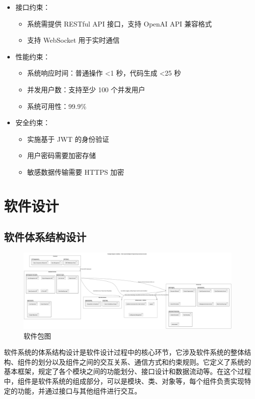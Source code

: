 \documentclass[
    report,     %
    oneside,    %
    UTF8,       %
    zihao=-4    %
]{config} %
\begin{document}
\begin{itemize}
\begin{itemize}
        \end{itemize}
    \item 接口约束：
        \begin{itemize}
            \item 系统需提供 RESTful API 接口，支持 OpenAI API 兼容格式
            \item 支持 WebSocket 用于实时通信
        \end{itemize}
    \item 性能约束：
        \begin{itemize}
            \item 系统响应时间：普通操作 <1 秒，代码生成 <25 秒
            \item 并发用户数：支持至少 100 个并发用户
            \item 系统可用性：99.9\%
        \end{itemize}
    \item 安全约束：
        \begin{itemize}
            \item 实施基于 JWT 的身份验证
            \item 用户密码需要加密存储
            \item 敏感数据传输需要 HTTPS 加密
        \end{itemize}
\end{itemize}
\section{软件设计}
\subsection{软件体系结构设计}
\begin{figure}[H]
    \centering
    \includegraphics[width=\textwidth]{UML/PackageDiagram.png}
    \caption{软件包图}
    \label{fig:package_diagram}
\end{figure}
软件系统的体系结构设计是软件设计过程中的核心环节，它涉及软件系统的整体结构、组件的划分以及组件之间的交互关系、通信方式和约束规则。它定义了系统的基本框架，规定了各个模块之间的功能划分、接口设计和数据流动等。在这个过程中，组件是软件系统的组成部分，可以是模块、类、对象等，每个组件负责实现特定的功能，并通过接口与其他组件进行交互。
\end{document}
